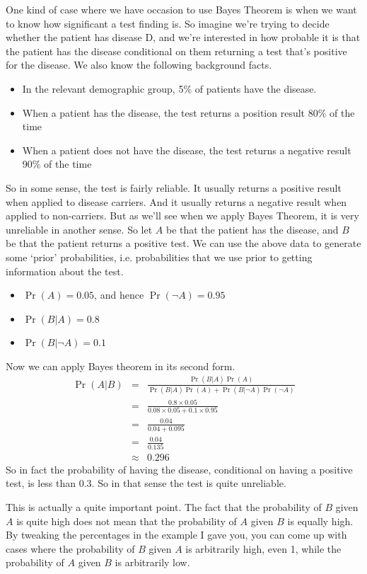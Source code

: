 \documentclass[openany]{book}
\begin{document}
One kind of case where we have occasion to use Bayes Theorem is when we want to know how significant a test finding is. So imagine we're trying to decide whether the patient has disease D, and we're interested in how probable it is that the patient has the disease conditional on them returning a test that's positive for the disease. We also know the following background facts.
\begin{itemize}
\item In the relevant demographic group, 5\% of patients have the disease.
\item When a patient has the disease, the test returns a position result 80\% of the time
\item When a patient does not have the disease, the test returns a negative result 90\% of the time
\end{itemize}
\noindent So in some sense, the test is fairly reliable. It usually returns a positive result when applied to disease carriers. And it usually returns a negative result when applied to non-carriers. But as we'll see when we apply Bayes Theorem, it is very unreliable in another sense. So let $A$ be that the patient has the disease, and $B$ be that the patient returns a positive test. We can use the above data to generate some `prior' probabilities, i.e. probabilities that we use prior to getting information about the test.
\begin{itemize}
\item $\Pr(A) = 0.05$, and hence $\Pr(\neg A) = 0.95$
\item $\Pr(B | A) = 0.8$
\item $\Pr(B | \neg A) = 0.1$
\end{itemize}
\noindent Now we can apply Bayes theorem in its second form.
\begin{eqnarray*}
\Pr(A|B) &=& \frac{\Pr(B|A) \Pr(A)}{\Pr(B|A)\Pr(A) + \Pr(B|\neg A)\Pr(\neg A)} \\
&=& \frac{0.8 \times 0.05}{0.08 \times 0.05 + 0.1 \times 0.95} \\
&=& \frac{0.04}{0.04 + 0.095} \\
&=& \frac{0.04}{0.135} \\
&\approx& 0.296
\end{eqnarray*} So in fact the probability of having the disease, conditional on having a positive test, is less than 0.3. So in that sense the test is quite unreliable.

This is actually a quite important point. The fact that the probability of $B$ given $A$ is quite high does not mean that the probability of $A$ given $B$ is equally high. By tweaking the percentages in the example I gave you, you can come up with cases where the probability of $B$ given $A$ is arbitrarily high, even 1, while the probability of $A$ given $B$ is arbitrarily low.
\end{document}
